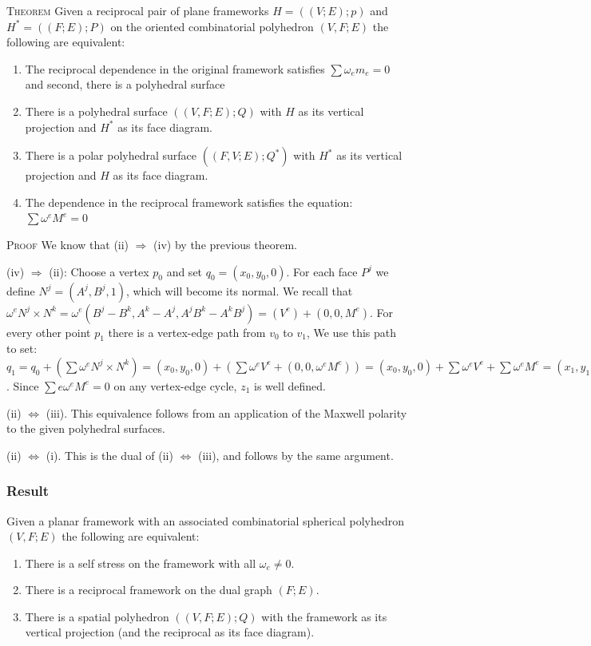 \documentclass[11pt]{article}
\theoremstyle{definition}
\begin{document}
 \textsc{Theorem} Given a reciprocal pair of plane frameworks $H=((V;E);p)$ and $H^* = ((F;E);P)$ on the oriented combinatorial polyhedron $(V,F;E)$ the following are equivalent: 
 \begin{enumerate} 
 	\item The reciprocal dependence in the original framework satisfies $\sum \omega_em_e = 0$ and second, there is a polyhedral surface 
 	\item There is a polyhedral surface $((V,F;E);Q)$ with $H$ as its vertical projection and $H^*$ as its face diagram.
	\item There is a polar polyhedral surface $((F,V;E);Q^*)$ with $H^*$ as its vertical projection and $H$ as its face diagram.
	\item The dependence in the reciprocal framework satisfies the equation: $\sum \omega^eM^e = 0$
\end{enumerate}
\textsc{Proof} We know that (ii) $\Rightarrow$ (iv) by the previous theorem. 

(iv) $\Rightarrow$ (ii): Choose a vertex $p_0$ and set $q_0 = (x_0, y_0,0)$. For each face $P^j$ we define $N^j = (A^j,B^j,1)$, which will become its normal. We recall that $\omega^eN^j \times N^k = \omega^e(B^j-B^k,A^k-A^j, A^jB^k-A^kB^j) = (V^e) + (0,0,M^e)$. For every other point $p_1$ there is a vertex-edge path from $v_0$ to $v_1$, We use this path to set: $q_1 = q_0 + (\sum \omega^eN^j \times N^k) = (x_0,y_0,0) + (\sum \omega^eV^e + (0,0,\omega^eM^e)) = (x_0,y_0,0) + \sum \omega^eV^e + \sum \omega^eM^e = (x_1,y_1,0) + (0,0,\sum \omega_eM^e)$. Since $\sum{e}\omega^eM^e = 0$ on any vertex-edge cycle, $z_1$ is well defined.

(ii) $\Leftrightarrow$ (iii). This equivalence follows from an application of the Maxwell polarity to the given polyhedral surfaces.

(ii) $\Leftrightarrow$ (i). This is the dual of (ii) $\Leftrightarrow$ (iii), and follows by the same argument. 

 
 
\subsubsection{Result}

Given a planar framework with an associated combinatorial spherical polyhedron $(V,F;E)$ the following are equivalent:
\begin{enumerate}
	\item There is a self stress on the framework with all $\omega_e \neq 0$.
	\item There is a reciprocal framework on the dual graph $(F;E)$.
	\item There is a spatial polyhedron $((V,F;E);Q)$ with the framework as its vertical projection (and the reciprocal as its face diagram).
 \end{enumerate}
 
\end{document}
